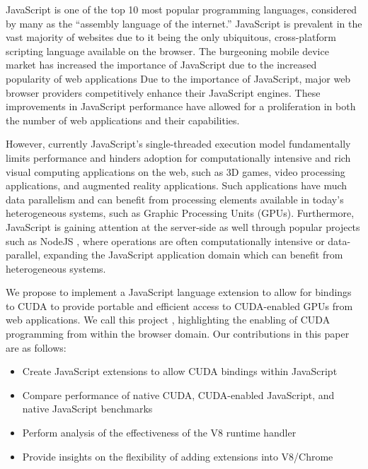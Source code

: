 
JavaScript is one of the top 10 most popular programming languages, 
considered by many as the “assembly language of the internet.” JavaScript is
prevalent in the vast majority of websites due to it being the only
ubiquitous, cross-platform scripting language available on the browser. The 
burgeoning mobile device market has increased the importance of JavaScript due
to the increased popularity of web applications
Due to the importance of JavaScript, major web browser providers competitively
enhance their JavaScript engines. These improvements in JavaScript performance
have allowed for a proliferation in both the number of web applications and
their capabilities.  

However, currently JavaScript's single-threaded execution model fundamentally limits
performance and hinders adoption for computationally intensive and rich visual
computing applications on the web, such as 3D games, video processing
applications, and augmented reality applications. Such applications have much data
parallelism and can benefit from processing elements available in today’s
heterogeneous systems, such as Graphic Processing Units (GPUs).  Furthermore,
JavaScript is gaining attention at the server-side as well through popular
projects such as NodeJS \cite{nodeJS}, where operations are often
computationally intensive or data-parallel, expanding the JavaScript application
domain which can benefit from heterogeneous systems.

We propose to implement a JavaScript language extension to allow for bindings to
CUDA to provide portable and efficient access to CUDA-enabled GPUs from web
applications.  We call this project \name, highlighting the enabling of CUDA
programming from within the browser domain. Our contributions in this paper are
as follows:


\begin{itemize}

\item Create JavaScript extensions to allow CUDA bindings within JavaScript
\item Compare performance of native CUDA, CUDA-enabled JavaScript, and native JavaScript benchmarks
\item Perform analysis of the effectiveness of the V8 runtime handler
\item Provide insights on the flexibility of adding extensions into V8/Chrome

\end{itemize}

